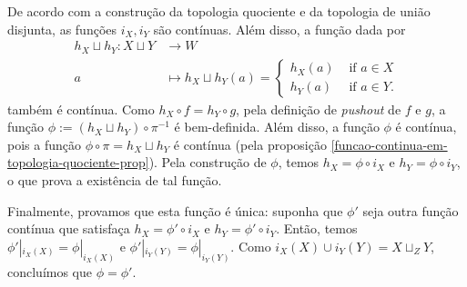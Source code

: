 \begin{dem}
    De acordo com a construção da topologia quociente e da topologia de união disjunta, as funções $i_X,i_Y$ são contínuas. Além disso, a função dada por 
    \begin{align*}
        h_X\sqcup h_Y:X\sqcup Y&\longrightarrow W\\
        a&\longmapsto h_X\sqcup h_Y(a)=\begin{cases}
         h_X(a) & \text{ if }a\in X\\
         h_Y(a) & \text{ if }a\in Y.
        \end{cases}
    \end{align*}
    também é contínua. Como $h_X\circ f=h_Y\circ g$, pela definição de \emph{pushout} de $f$ e $g$, a função $\phi:=(h_X\sqcup h_Y)\circ \pi^{-1}$ é bem-definida. Além disso, a função $\phi$ é contínua, pois a função $\phi\circ\pi=h_X\sqcup h_Y$ é contínua (pela proposição \ref{funcao-continua-em-topologia-quociente-prop}). Pela construção de $\phi$, temos $h_X=\phi\circ i_X$ e $h_Y=\phi\circ i_Y$, o que prova a existência de tal função.

    Finalmente, provamos que esta função é única: suponha que $\phi'$ seja outra função contínua que satisfaça $h_X=\phi'\circ i_X$ e $h_Y=\phi'\circ i_Y$. Então, temos $\phi'|_{i_X(X)}=\phi|_{i_X(X)}$ e $\phi'|_{i_Y(Y)}=\phi|_{i_Y(Y)}$. Como $i_X(X)\cup i_Y(Y)=X\sqcup_ZY$, concluímos que $\phi=\phi'$.
\end{dem}

